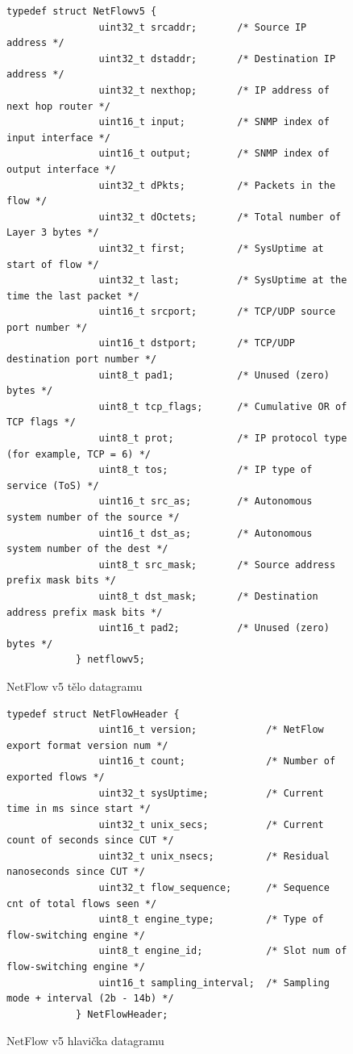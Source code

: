\documentclass[11pt, a4paper, hidelinks]{article}[08.10.2023]
\begin{document}
    \begin{figure}[H]
        \centering
        \begin{lstlisting}[style=CStyle]
            typedef struct NetFlowv5 {
                uint32_t srcaddr;       /* Source IP address */
                uint32_t dstaddr;       /* Destination IP address */
                uint32_t nexthop;       /* IP address of next hop router */
                uint16_t input;         /* SNMP index of input interface */
                uint16_t output;        /* SNMP index of output interface */
                uint32_t dPkts;         /* Packets in the flow */
                uint32_t dOctets;       /* Total number of Layer 3 bytes */
                uint32_t first;         /* SysUptime at start of flow */
                uint32_t last;          /* SysUptime at the time the last packet */
                uint16_t srcport;       /* TCP/UDP source port number */
                uint16_t dstport;       /* TCP/UDP destination port number */
                uint8_t pad1;           /* Unused (zero) bytes */
                uint8_t tcp_flags;      /* Cumulative OR of TCP flags */
                uint8_t prot;           /* IP protocol type (for example, TCP = 6) */
                uint8_t tos;            /* IP type of service (ToS) */
                uint16_t src_as;        /* Autonomous system number of the source */
                uint16_t dst_as;        /* Autonomous system number of the dest */
                uint8_t src_mask;       /* Source address prefix mask bits */
                uint8_t dst_mask;       /* Destination address prefix mask bits */
                uint16_t pad2;          /* Unused (zero) bytes */
            } netflowv5;
        \end{lstlisting}
        \caption{NetFlow v5 tělo datagramu}
        \label{netflowstruct}
    \end{figure}

    \begin{figure}[H]
        \centering
        \begin{lstlisting}[style=CStyle]
            typedef struct NetFlowHeader {
                uint16_t version;            /* NetFlow export format version num */
                uint16_t count;              /* Number of exported flows */
                uint32_t sysUptime;          /* Current time in ms since start */
                uint32_t unix_secs;          /* Current count of seconds since CUT */
                uint32_t unix_nsecs;         /* Residual nanoseconds since CUT */
                uint32_t flow_sequence;      /* Sequence cnt of total flows seen */
                uint8_t engine_type;         /* Type of flow-switching engine */
                uint8_t engine_id;           /* Slot num of flow-switching engine */
                uint16_t sampling_interval;  /* Sampling mode + interval (2b - 14b) */
            } NetFlowHeader;
        \end{lstlisting}
        \caption{NetFlow v5 hlavička datagramu}
        \label{netflowhdr}
    \end{figure}
\end{document}
